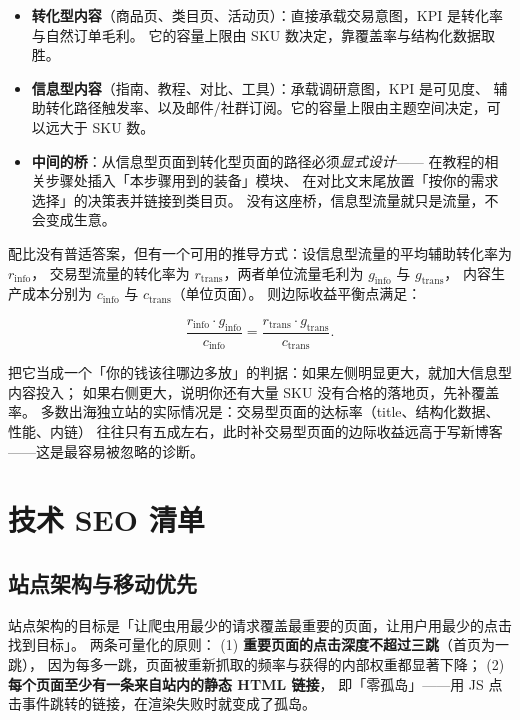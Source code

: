 \begin{itemize}
  \item \textbf{转化型内容}（商品页、类目页、活动页）：直接承载交易意图，KPI 是转化率与自然订单毛利。
        它的容量上限由 SKU 数决定，靠覆盖率与结构化数据取胜。
  \item \textbf{信息型内容}（指南、教程、对比、工具）：承载调研意图，KPI 是可见度、
        辅助转化路径触发率、以及邮件/社群订阅。它的容量上限由主题空间决定，可以远大于 SKU 数。
  \item \textbf{中间的桥}：从信息型页面到转化型页面的路径必须\emph{显式设计}——
        在教程的相关步骤处插入「本步骤用到的装备」模块、
        在对比文末尾放置「按你的需求选择」的决策表并链接到类目页。
        没有这座桥，信息型流量就只是流量，不会变成生意。
\end{itemize}

配比没有普适答案，但有一个可用的推导方式：设信息型流量的平均辅助转化率为 $r_{\text{info}}$，
交易型流量的转化率为 $r_{\text{trans}}$，两者单位流量毛利为 $g_{\text{info}}$ 与 $g_{\text{trans}}$，
内容生产成本分别为 $c_{\text{info}}$ 与 $c_{\text{trans}}$（单位页面）。
则边际收益平衡点满足：

\begin{equation}
\frac{r_{\text{info}} \cdot g_{\text{info}}}{c_{\text{info}}} = \frac{r_{\text{trans}} \cdot g_{\text{trans}}}{c_{\text{trans}}} .
\label{eq:contentmix}
\end{equation}

把它当成一个「你的钱该往哪边多放」的判据：如果左侧明显更大，就加大信息型内容投入；
如果右侧更大，说明你还有大量 SKU 没有合格的落地页，先补覆盖率。
多数出海独立站的实际情况是：交易型页面的达标率（title、结构化数据、性能、内链）
往往只有五成左右，此时补交易型页面的边际收益远高于写新博客——这是最容易被忽略的诊断。

\section{技术 SEO 清单}
\label{sec:seo-tech}

\subsection{站点架构与移动优先}

站点架构的目标是「让爬虫用最少的请求覆盖最重要的页面，让用户用最少的点击找到目标」。
两条可量化的原则：
(1) \textbf{重要页面的点击深度不超过三跳}（首页为一跳），
因为每多一跳，页面被重新抓取的频率与获得的内部权重都显著下降；
(2) \textbf{每个页面至少有一条来自站内的静态 HTML 链接}，
即「零孤岛」——用 JS 点击事件跳转的链接，在渲染失败时就变成了孤岛。

